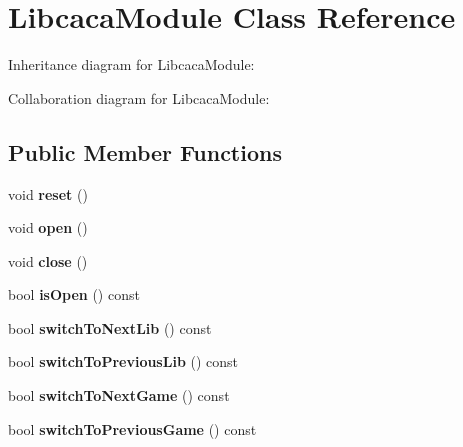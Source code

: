 \hypertarget{class_libcaca_module}{}\section{Libcaca\+Module Class Reference}
\label{class_libcaca_module}


Inheritance diagram for Libcaca\+Module\+:


Collaboration diagram for Libcaca\+Module\+:
\subsection*{Public Member Functions}
\begin{DoxyCompactItemize}
\item 
\mbox{\label{class_libcaca_module_a4813d7144fb0de170833b975a5840224}} 
void {\bfseries reset} ()
\item 
\mbox{\label{class_libcaca_module_ad1d8a0aa64f5f439563b7fa8b7019322}} 
void {\bfseries open} ()
\item 
\mbox{\label{class_libcaca_module_a7f7bbc950d791ba989425923b5fcd57e}} 
void {\bfseries close} ()
\item 
\mbox{\label{class_libcaca_module_a36e0a11c224fb355e78cf62ecaf42b0a}} 
bool {\bfseries is\+Open} () const
\item 
\mbox{\label{class_libcaca_module_acffd5646bc6b1c140654a8c9901a51dd}} 
bool {\bfseries switch\+To\+Next\+Lib} () const
\item 
\mbox{\label{class_libcaca_module_a2da8f3d3bf838d03660d9cb0b65a741b}} 
bool {\bfseries switch\+To\+Previous\+Lib} () const
\item 
\mbox{\label{class_libcaca_module_a1b391e7684214d99c8732b082cf5935b}} 
bool {\bfseries switch\+To\+Next\+Game} () const
\item 
\mbox{\label{class_libcaca_module_a66d988af74f073bfbc14d989b8d982ad}} 
bool {\bfseries switch\+To\+Previous\+Game} () const
\item 

\end{DoxyCompactItemize}
